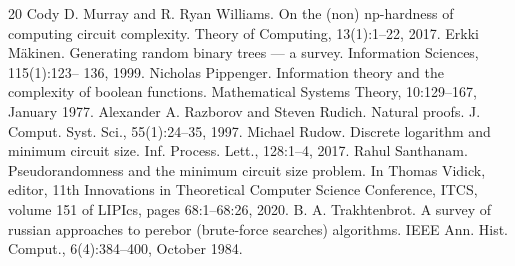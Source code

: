 \begin{thebibliography}{20}
Cody D. Murray and R. Ryan Williams. On the (non) np-hardness of computing circuit complexity. Theory of Computing, 13(1):1–22, 2017.
Erkki Mäkinen. Generating random binary trees — a survey. Information Sciences, 115(1):123– 136, 1999.
Nicholas Pippenger. Information theory and the complexity of boolean functions. Mathematical Systems Theory, 10:129–167, January 1977.
Alexander A. Razborov and Steven Rudich. Natural proofs. J. Comput. Syst. Sci., 55(1):24–35, 1997.
Michael Rudow. Discrete logarithm and minimum circuit size. Inf. Process. Lett., 128:1–4, 2017.
Rahul Santhanam. Pseudorandomness and the minimum circuit size problem. In Thomas Vidick, editor, 11th Innovations in Theoretical Computer Science Conference, ITCS, volume 151 of LIPIcs, pages 68:1–68:26, 2020.
B. A. Trakhtenbrot. A survey of russian approaches to perebor (brute-force searches) algorithms. IEEE Ann. Hist. Comput., 6(4):384–400, October 1984.
\end{thebibliography}
